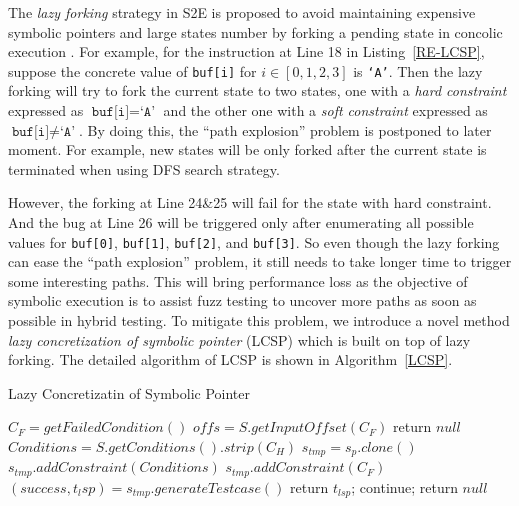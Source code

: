 The \textit{lazy forking} strategy in S2E is proposed to avoid maintaining expensive symbolic pointers and large states number by forking a pending state in concolic execution \cite{chipounov2011s2e}. 
For example, for the instruction at Line 18 in Listing~\ref{RE-LCSP}, suppose the concrete value of \texttt{buf[i]} for $i\in[0,1,2,3]$ is \texttt{`A'}. 
Then the lazy forking will try to fork the current state to two states, one with a \textit{hard constraint} expressed as $\texttt{buf[i]}=\texttt{`A'}$ and the other one with a \textit{soft constraint} expressed as $\texttt{buf[i]}\neq\texttt{`A'}$.
By doing this, the ``path explosion'' problem is postponed to later moment. For example, new states will be only forked after the current state is terminated when using DFS search strategy.
 

However, the forking at Line 24\&25 will fail for the state with hard constraint. And the bug at Line 26 will be triggered only after enumerating all possible values for \texttt{buf[0]}, \texttt{buf[1]}, \texttt{buf[2]}, and \texttt{buf[3]}. So even though the lazy forking can ease the ``path explosion'' problem, it still needs to take longer time to trigger some interesting paths. This will bring performance loss as the objective of symbolic execution is to assist fuzz testing to uncover more paths as soon as possible in hybrid testing. 
To mitigate this problem, we introduce a novel method \emph{lazy concretization of symbolic pointer} (LCSP) which is built on top of lazy forking. The detailed algorithm of LCSP is shown in Algorithm~\ref{LCSP}.

\begin{algorithm}
  \caption{Lazy Concretizatin of Symbolic Pointer}
  \label{LCSP}
  $C_F = getFailedCondition()$\;
  $offs = S.getInputOffset(C_F)$\;
  {
    return $null$\;
  }
  $Conditions = S.getConditions().strip(C_H)$\;
  {
    $s_{tmp} = s_p.clone()$\;
    $s_{tmp}.addConstraint(Conditions)$\;
    $s_{tmp}.addConstraint(C_F)$\;
    $(success, t_lsp) = s_{tmp}.generateTestcase()$\;
    {
      return $t_{lsp}$;
    } {
      continue;
    }
  }
  return $null$\;
\end{algorithm}
  
